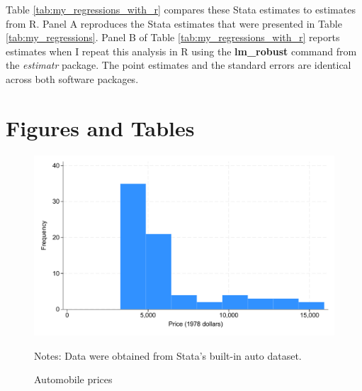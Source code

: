 \documentclass[12pt]{article}
\begin{document}
Table \ref{tab:my_regressions_with_r} compares these Stata estimates to estimates from R. Panel A reproduces the Stata estimates that were presented in Table \ref{tab:my_regressions}.  Panel B of Table \ref{tab:my_regressions_with_r} reports estimates when I repeat this analysis in R using the \textbf{lm\_robust} command from the \textit{estimatr} package. The point estimates and the standard errors are identical across both software packages.

\clearpage
\section{Figures and Tables}


\begin{figure}[ht]
\caption{Automobile prices}\label{fig:price_histogram}
\begin{center}
{\includegraphics[width=1\textwidth]{./figures/price_histogram.pdf}}
\parbox{\linewidth}{\footnotesize {Notes: Data were obtained from Stata's built-in auto dataset.}}
\end{center}


\end{figure}
\clearpage





\end{document}
